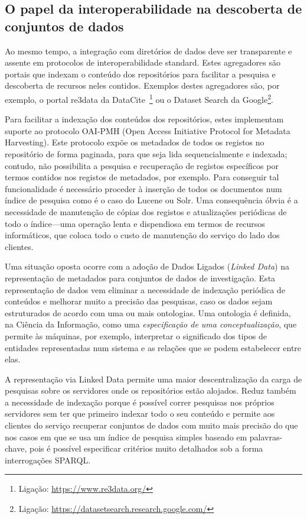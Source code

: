 \documentclass[sigconf,nonacm]{acmart}
\begin{document}
\subsection{O papel da interoperabilidade na descoberta de conjuntos de dados}

Ao mesmo tempo, a integração com diretórios de dados deve ser transparente e assente em protocolos de interoperabilidade standard. Estes agregadores são portais que indexam o conteúdo dos repositórios para facilitar a pesquisa e descoberta de recursos neles contidos. Exemplos destes agregadores são, por exemplo, o portal re3data da DataCite~\footnote{Ligação: \url{https://www.re3data.org/}} ou o Dataset Search da Google\footnote{Ligação: \url{https://datasetsearch.research.google.com/}}.

Para facilitar a indexação dos conteúdos dos repositórios, estes implementam suporte ao protocolo OAI-PMH (Open Access Initiative Protocol for Metadata Harvesting). Este protocolo expõe os metadados de todos os registos no repositório de forma paginada, para que seja lida sequencialmente e indexada; contudo, não possibilita a pesquisa e recuperação de registos específicos por termos contidos nos registos de metadados, por exemplo. Para conseguir tal funcionalidade é necessário proceder à inserção de todos os documentos num índice de pesquisa como é o caso do Lucene ou Solr. Uma consequência óbvia é a necessidade de manutenção de cópias dos registos e atualizações periódicas de todo o índice---uma operação lenta e dispendiosa em termos de recursos informáticos, que coloca todo o custo de manutenção do serviço do lado dos clientes.

Uma situação oposta ocorre com a adoção de Dados Ligados (\textit{Linked Data}) na representação de metadados para conjuntos de dados de investigação. Esta representação de dados vem eliminar a necessidade de indexação periódica de conteúdos e melhorar muito a precisão das pesquisas, caso os dados sejam estruturados de acordo com uma ou mais ontologias. Uma ontologia é definida, na Ciência da Informação, como uma \textit{especificação de uma conceptualização}\cite{gruber1995toward}, que permite às máquinas, por exemplo, interpretar o significado dos tipos de entidades representadas num sistema e as relações que se podem estabelecer entre elas.

A representação via Linked Data permite uma maior descentralização da carga de pesquisas sobre os servidores onde os repositórios estão alojados. Reduz também a necessidade de indexação porque é possível correr pesquisas nos próprios servidores sem ter que primeiro indexar todo o seu conteúdo e permite aos clientes do serviço recuperar conjuntos de dados com muito mais precisão do que nos casos em que se usa um índice de pesquisa simples baseado em palavras-chave, pois é possível especificar critérios muito detalhados sob a forma interrogações SPARQL.
\end{document}
